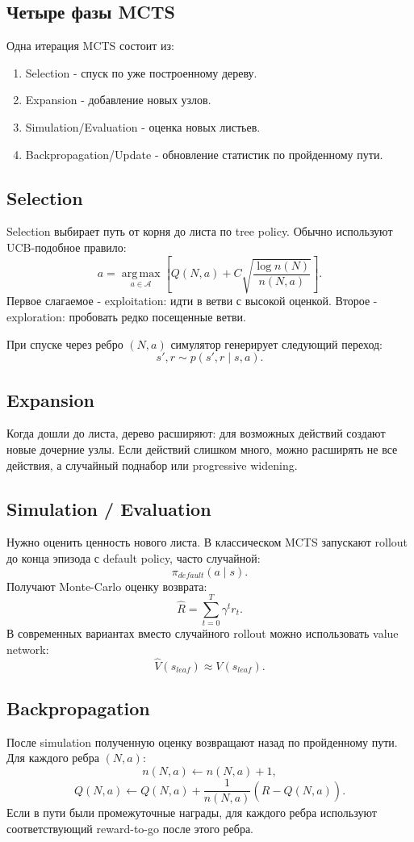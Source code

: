 \documentclass[11pt,a4paper]{article}
\newcommand{\argmax}{\operatorname*{arg\,max}}
\newcommand{\1}{\mathbf{1}}
\newcommand{\cA}{\mathcal A}
\begin{document}
\subsection*{Четыре фазы MCTS}
Одна итерация MCTS состоит из:
\begin{enumerate}
    \item Selection - спуск по уже построенному дереву.
    \item Expansion - добавление новых узлов.
    \item Simulation/Evaluation - оценка новых листьев.
    \item Backpropagation/Update - обновление статистик по пройденному пути.
\end{enumerate}

\subsection*{Selection}
Selection выбирает путь от корня до листа по tree policy. Обычно используют UCB-подобное правило:
\[
    a=\argmax_{a\in\cA}\left[
    Q(N,a)+C\sqrt{\frac{\log n(N)}{n(N,a)}}
    \right].
\]
Первое слагаемое - exploitation: идти в ветви с высокой оценкой. Второе - exploration: пробовать редко посещенные ветви.

При спуске через ребро $(N,a)$ симулятор генерирует следующий переход:
\[
    s',r\sim p(s',r\mid s,a).
\]

\subsection*{Expansion}
Когда дошли до листа, дерево расширяют: для возможных действий создают новые дочерние узлы. Если действий слишком много, можно расширять не все действия, а случайный поднабор или progressive widening.

\subsection*{Simulation / Evaluation}
Нужно оценить ценность нового листа. В классическом MCTS запускают rollout до конца эпизода с default policy, часто случайной:
\[
    \pi_{default}(a\mid s).
\]
Получают Monte-Carlo оценку возврата:
\[
    \hat R=\sum_{t=0}^{T}\gamma^t r_t.
\]
В современных вариантах вместо случайного rollout можно использовать value network:
\[
    \hat V(s_{leaf})\approx V(s_{leaf}).
\]

\subsection*{Backpropagation}
После simulation полученную оценку возвращают назад по пройденному пути. Для каждого ребра $(N,a)$:
\[
    n(N,a)\leftarrow n(N,a)+1,
\]
\[
    Q(N,a)\leftarrow Q(N,a)+\frac1{n(N,a)}\left(\hat R-Q(N,a)\right).
\]
Если в пути были промежуточные награды, для каждого ребра используют соответствующий reward-to-go после этого ребра.
\end{document}
